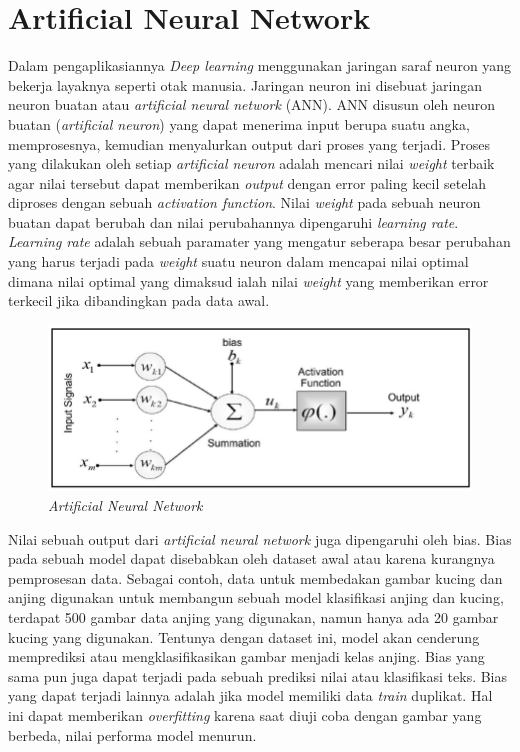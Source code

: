 \section{Artificial Neural Network}
Dalam pengaplikasiannya \textit{Deep learning} menggunakan jaringan saraf neuron yang bekerja layaknya seperti
otak manusia. Jaringan neuron ini disebuat jaringan neuron buatan atau \textit{artificial neural network} (ANN).
ANN disusun oleh neuron buatan (\textit{artificial neuron}) yang dapat menerima input berupa suatu angka, memprosesnya, 
kemudian menyalurkan output dari proses yang terjadi. Proses yang dilakukan oleh setiap \textit{artificial neuron}
adalah mencari nilai \textit{weight} terbaik agar nilai tersebut dapat memberikan \textit{output} dengan error paling
kecil setelah diproses dengan sebuah \textit{activation function}. Nilai \textit{weight} pada sebuah
neuron buatan dapat berubah dan nilai perubahannya dipengaruhi \textit{learning rate}. \textit{Learning rate}
adalah sebuah paramater yang mengatur seberapa besar perubahan yang harus terjadi pada \textit{weight} suatu neuron
dalam mencapai nilai optimal dimana nilai optimal yang dimaksud ialah nilai \textit{weight} yang memberikan error terkecil
jika dibandingkan pada data awal.

\begin{figure}[h!]
    \begin{center}
      \includegraphics[width= 0.7\linewidth]{bab2/ANN 2.png}
      \caption{\textit{Artificial Neural Network}}
      \label{fig: ANN}
    \end{center}
\end{figure}

Nilai sebuah output dari \textit{artificial neural network} juga
dipengaruhi oleh bias. Bias pada sebuah model dapat disebabkan oleh dataset awal atau karena kurangnya
pemprosesan data. Sebagai contoh, data untuk membedakan gambar kucing dan anjing digunakan untuk membangun
sebuah model klasifikasi anjing dan kucing, terdapat 500 gambar data anjing yang digunakan, namun
hanya ada 20 gambar kucing yang digunakan. Tentunya dengan dataset ini, model akan cenderung
memprediksi atau mengklasifikasikan gambar menjadi kelas anjing. Bias yang sama pun juga dapat terjadi
pada sebuah prediksi nilai atau klasifikasi teks. Bias yang dapat terjadi lainnya adalah jika model
memiliki data \textit{train} duplikat. Hal ini dapat memberikan \textit{overfitting} 
karena saat diuji coba dengan gambar yang berbeda, nilai performa model menurun.

